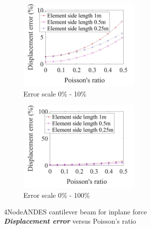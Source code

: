 \documentclass[fleqn,11pt,letter]{article}
\begin{document}


\begin{figure}[H]
  \begin{subfigure}{0.5\textwidth}
    \centering
    \includegraphics[width=6cm]{../Figure_files/4NodeANDES/error4andes_beam_dif_poisson_disp_inplane_div.jpeg}
    \caption{Error scale 0\% - 10\%}
  \end{subfigure}
  \begin{subfigure}{0.5\textwidth}
    \centering
    \includegraphics[width=6cm]{../Figure_files/4NodeANDES/error4andes_beam_dif_poisson_disp_inplane_div100.jpeg}
    \caption{Error scale 0\% - 100\%}
  \end{subfigure}
  \captionsetup{justification=centering,margin=2cm}
  \caption{4NodeANDES cantilever beam for inplane force\\
      \emph{\textbf{Displacement error}}   versus   Poisson's ratio}
  \label{table Displacement error 4NodeANDES cantilever beam for different Poisson ratio 2}
\end{figure}
\end{document}
